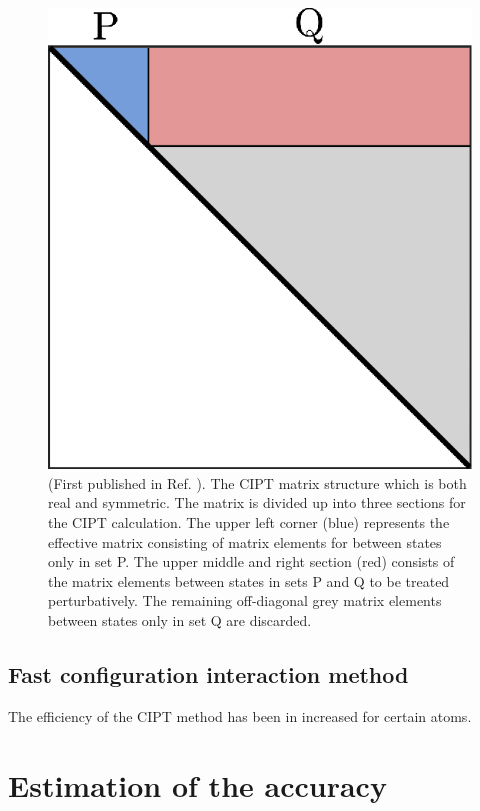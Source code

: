\documentclass[10pt,a4paper, twoside, openright]{report}
\begin{document}
\begin{figure}
\centering
\includegraphics[scale=1]{./figures/CIPT_matrix.eps}
\caption[CIPT matrix structure.]{(First published in Ref. \cite{Dzuba2017}). The CIPT matrix structure which is both real and symmetric. The matrix is divided up into three sections for the CIPT calculation. The upper left corner (blue) represents the effective matrix consisting of matrix elements for between states only in set P. The upper middle and right section (red) consists of the matrix elements between states in sets P and Q to be treated perturbatively. The remaining off-diagonal grey matrix elements between states only in set Q are discarded. \label{fig:CIPT_matrix}}
\end{figure}

\subsection{Fast configuration interaction method}
The efficiency of the CIPT method has been in increased for certain atoms.
\section{Estimation of the accuracy} \label{sec:Accuracy}
\end{document}
